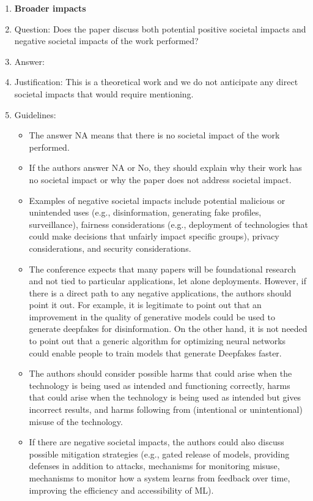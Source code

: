 \documentclass{article}
\theoremstyle{plain}
\theoremstyle{remark}
\begin{document}
\begin{enumerate}
\item {\bf Broader impacts}
    \item[] Question: Does the paper discuss both potential positive societal impacts and negative societal impacts of the work performed?
    \item[] Answer: \answerNA{} %
    \item[] Justification: This is a theoretical work and we do not anticipate any direct societal impacts that would require mentioning.
    \item[] Guidelines:
    \begin{itemize}
        \item The answer NA means that there is no societal impact of the work performed.
        \item If the authors answer NA or No, they should explain why their work has no societal impact or why the paper does not address societal impact.
        \item Examples of negative societal impacts include potential malicious or unintended uses (e.g., disinformation, generating fake profiles, surveillance), fairness considerations (e.g., deployment of technologies that could make decisions that unfairly impact specific groups), privacy considerations, and security considerations.
        \item The conference expects that many papers will be foundational research and not tied to particular applications, let alone deployments. However, if there is a direct path to any negative applications, the authors should point it out. For example, it is legitimate to point out that an improvement in the quality of generative models could be used to generate deepfakes for disinformation. On the other hand, it is not needed to point out that a generic algorithm for optimizing neural networks could enable people to train models that generate Deepfakes faster.
        \item The authors should consider possible harms that could arise when the technology is being used as intended and functioning correctly, harms that could arise when the technology is being used as intended but gives incorrect results, and harms following from (intentional or unintentional) misuse of the technology.
        \item If there are negative societal impacts, the authors could also discuss possible mitigation strategies (e.g., gated release of models, providing defenses in addition to attacks, mechanisms for monitoring misuse, mechanisms to monitor how a system learns from feedback over time, improving the efficiency and accessibility of ML).
    \end{itemize}
    

\end{enumerate}
\end{document}
